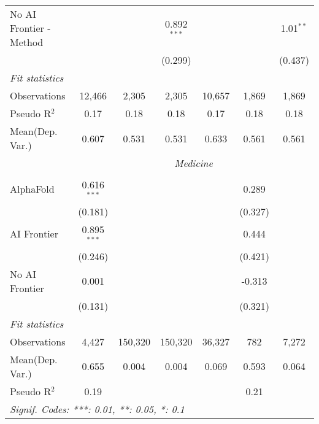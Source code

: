 \begin{tabular}{lcccccc}
   No AI Frontier - Method &               &               & 0.892$^{***}$ &               &             & 1.01$^{**}$\\   
                           &               &               & (0.299)       &               &             & (0.437)\\   
   \midrule
   \emph{Fit statistics}\\
   Observations            & 12,466        & 2,305         & 2,305         & 10,657        & 1,869       & 1,869\\  
   Pseudo R$^2$            & 0.17          & 0.18          & 0.18          & 0.17          & 0.18        & 0.18\\  
   
Mean(Dep. Var.) & 0.607 & 0.531 & 0.531 & 0.633 & 0.561 & 0.561 \\
 & \multicolumn{6}{c}{\textit{Medicine}} \\ \\
   AlphaFold      & 0.616$^{***}$ &         &         &        & 0.289   &   \\   
                  & (0.181)       &         &         &        & (0.327) &   \\   
   AI Frontier    & 0.895$^{***}$ &         &         &        & 0.444   &   \\   
                  & (0.246)       &         &         &        & (0.421) &   \\   
   No AI Frontier & 0.001         &         &         &        & -0.313  &   \\   
                  & (0.131)       &         &         &        & (0.321) &   \\   
   \midrule
   \emph{Fit statistics}\\
   Observations   & 4,427         & 150,320 & 150,320 & 36,327 & 782     & 7,272\\  
Mean(Dep. Var.) & 0.655 & 0.004 & 0.004 & 0.069 & 0.593 & 0.064 \\
   Pseudo R$^2$   & 0.19          &         &         &        & 0.21    & \\  
   \midrule \midrule
   \multicolumn{7}{l}{\emph{Signif. Codes: ***: 0.01, **: 0.05, *: 0.1}}\\
\end{tabular}
\par\endgroup
